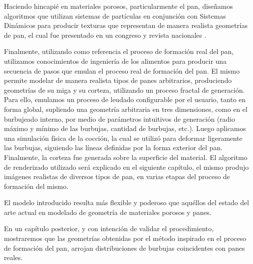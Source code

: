 Haciendo hincapié en materiales porosos, particularmente el pan, diseñamos algoritmos que utilizan sistemas de partículas en conjunción con Sistemas Dinámicos para producir texturas que representan de manera realista geometrías de pan, el cual fue presentado en un congreso y revista nacionales \cite{Baravalle2014}.

Finalmente, utilizando como referencia el proceso de formación real del pan, utilizamos conocimientos de ingeniería de los alimentos para producir una secuencia de pasos que emulan el proceso real de formación del pan.
El mismo permite modelar de manera realista tipos de panes arbitrarios, produciendo geometrías de su miga y su corteza, utilizando un proceso fractal de generación.
Para ello, emulamos un proceso de leudado configurable por el usuario, tanto en forma global, supliendo una geometría arbitraria en tres dimensiones, como en el burbujeado interno, por medio de parámetros intuitivos de generación (radio máximo y mínimo de las burbujas, cantidad de burbujas, etc.).
Luego aplicamos una simulación física de la cocción, la cual se utilizó para deformar ligeramente las burbujas, siguiendo las líneas definidas por la forma exterior del pan.
Finalmente, la corteza fue generada sobre la superficie del material.
El algoritmo de renderizado utilizado será explicado en el siguiente capítulo, el mismo produjo imágenes realistas de diversos tipos de pan, en varias etapas del proceso de formación del mismo.

El modelo introducido resulta más flexible y poderoso que aquéllos del estado del arte actual en modelado de geometría de materiales porosos y panes.

En un capítulo posterior, y con intención de validar el procedimiento, mostraremos que las geometrías obtenidas por el método inspirado en el proceso de formación del pan, arrojan distribuciones de burbujas coincidentes con panes reales.

